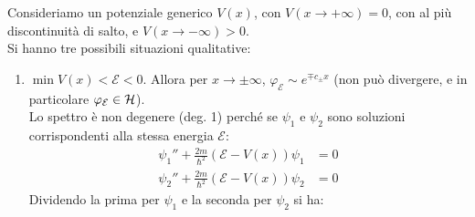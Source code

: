 \documentclass[../../FisicaTeorica.tex]{subfiles}
\begin{document}
Consideriamo un potenziale generico $V(x)$, con $V(x\to + \infty)=0$, con al più discontinuità di salto, e $V(x\to-\infty) > 0$.\\
Si hanno tre possibili situazioni qualitative:
\begin{enumerate}
\item $\min V(x) < \mathcal{E} < 0$. Allora per $x\to \pm \infty$, $\varphi_\mathcal{E}\sim e^{\mp c_\pm x}$ (non può divergere, e in particolare $\varphi_\mathcal{E}\in \mathcal{H}$).\\
Lo spettro è non degenere (deg. 1) perché se $\psi_1$ e $\psi_2$ sono soluzioni corrispondenti alla stessa energia $\mathcal{E}$:
\begin{align*}
\psi_1'' + \frac{2m}{\hbar^2}(\mathcal{E}-V(x))\psi_1 &= 0\\
\psi_2'' + \frac{2m}{\hbar^2}(\mathcal{E}-V(x))\psi_2 &= 0
\end{align*}
Dividendo la prima per $\psi_1$ e la seconda per $\psi_2$ si ha:


\end{enumerate}
\end{document}
